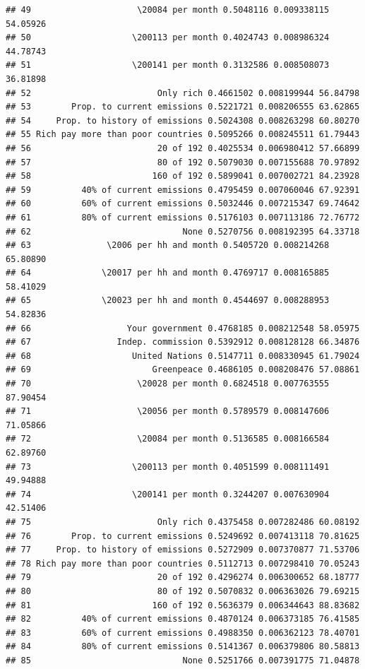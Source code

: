 \documentclass[a4paper,12pt]{article}\usepackage[]{graphicx}\usepackage[]{color}
\makeatletter
\newenvironment{kframe}{%
 \def\at@end@of@kframe{}%
 \ifinner\ifhmode%
  \def\at@end@of@kframe{\end{minipage}}%
  \begin{minipage}{\columnwidth}%
 \fi\fi%
 \def\FrameCommand##1{\hskip\@totalleftmargin \hskip-\fboxsep
 \colorbox{shadecolor}{##1}\hskip-\fboxsep
     \hskip-\linewidth \hskip-\@totalleftmargin \hskip\columnwidth}%
 \MakeFramed {\advance\hsize-\width
   \@totalleftmargin\z@ \linewidth\hsize
   \@setminipage}}%
 {\par\unskip\endMakeFramed%
 \at@end@of@kframe}
\newenvironment{knitrout}{}{} %
\makeatother
\begin{document}
\begin{knitrout}
\begin{kframe}
\begin{verbatim}
## 49                     \20084 per month 0.5048116 0.009338115 54.05926
## 50                    \200113 per month 0.4024743 0.008986324 44.78743
## 51                    \200141 per month 0.3132586 0.008508073 36.81898
## 52                         Only rich 0.4661502 0.008199944 56.84798
## 53        Prop. to current emissions 0.5221721 0.008206555 63.62865
## 54     Prop. to history of emissions 0.5024308 0.008263298 60.80270
## 55 Rich pay more than poor countries 0.5095266 0.008245511 61.79443
## 56                         20 of 192 0.4025534 0.006980412 57.66899
## 57                         80 of 192 0.5079030 0.007155688 70.97892
## 58                        160 of 192 0.5899041 0.007002721 84.23928
## 59          40% of current emissions 0.4795459 0.007060046 67.92391
## 60          60% of current emissions 0.5032446 0.007215347 69.74642
## 61          80% of current emissions 0.5176103 0.007113186 72.76772
## 62                              None 0.5270756 0.008192395 64.33718
## 63               \2006 per hh and month 0.5405720 0.008214268 65.80890
## 64              \20017 per hh and month 0.4769717 0.008165885 58.41029
## 65              \20023 per hh and month 0.4544697 0.008288953 54.82836
## 66                   Your government 0.4768185 0.008212548 58.05975
## 67                 Indep. commission 0.5392912 0.008128128 66.34876
## 68                    United Nations 0.5147711 0.008330945 61.79024
## 69                        Greenpeace 0.4686105 0.008208476 57.08861
## 70                     \20028 per month 0.6824518 0.007763555 87.90454
## 71                     \20056 per month 0.5789579 0.008147606 71.05866
## 72                     \20084 per month 0.5136585 0.008166584 62.89760
## 73                    \200113 per month 0.4051599 0.008111491 49.94888
## 74                    \200141 per month 0.3244207 0.007630904 42.51406
## 75                         Only rich 0.4375458 0.007282486 60.08192
## 76        Prop. to current emissions 0.5249692 0.007413118 70.81625
## 77     Prop. to history of emissions 0.5272909 0.007370877 71.53706
## 78 Rich pay more than poor countries 0.5112713 0.007298410 70.05243
## 79                         20 of 192 0.4296274 0.006300652 68.18777
## 80                         80 of 192 0.5070832 0.006363026 79.69215
## 81                        160 of 192 0.5636379 0.006344643 88.83682
## 82          40% of current emissions 0.4870124 0.006373185 76.41585
## 83          60% of current emissions 0.4988350 0.006362123 78.40701
## 84          80% of current emissions 0.5141367 0.006379806 80.58813
## 85                              None 0.5251766 0.007391775 71.04878

\end{verbatim}
\end{kframe}
\end{knitrout}
\end{document}
